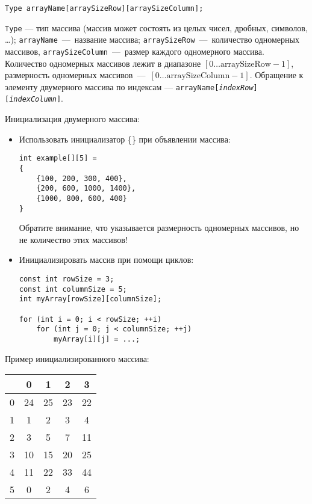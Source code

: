 \lstinline|Type arrayName[arraySizeRow][arraySizeColumn];|

\lstinline|Type| --- тип массива (массив может состоять из целых чисел, дробных, символов, \ldots); \lstinline|arrayName|~---~название массива; \lstinline|arraySizeRow|~---~количество одномерных массивов, \lstinline|arraySizeColumn|~---~размер каждого одномерного массива. Количество одномерных массивов лежит в диапазоне $\left[ 0 \ldots \text{arraySizeRow} - 1 \right]$, размерность одномерных массивов~---~$\left[ 0 \ldots \text{arraySizeColumn} - 1 \right]$. Обращение к элементу двумерного массива по индексам --- \texttt{arrayName[\textit{indexRow}][\textit{indexColumn}]}.

Инициализация двумерного массива:
\begin{itemize}
    \item Использовать инициализатор \{\} при объявлении массива:
    \begin{lstlisting}
int example[][5] =
{
    {100, 200, 300, 400},
    {200, 600, 1000, 1400},
    {1000, 800, 600, 400}
}
    \end{lstlisting}

    Обратите внимание, что указывается размерность одномерных массивов, но не количество этих массивов!

    \item Инициализировать массив при помощи циклов:
    \begin{lstlisting}
const int rowSize = 3;
const int columnSize = 5;
int myArray[rowSize][columnSize];

for (int i = 0; i < rowSize; ++i)
    for (int j = 0; j < columnSize; ++j)
        myArray[i][j] = ...;
    \end{lstlisting}
\end{itemize}

Пример инициализированного массива:
\begin{table}[h]
    \begin{tabular}{|c|c|c|c|c|}
        \hline
          & 0 & 1 & 2 & 3 \\
        \hline
        0 & 24 & 25 & 23 & 22 \\
        \hline
        1 & 1 & 2 & 3 & 4 \\
        \hline
        2 & 3 & 5 & 7 & 11 \\
        \hline
        3 & 10 & 15 & 20 & 25 \\
        \hline
        4 & 11 & 22 & 33 & 44 \\
        \hline
        5 & 0 & 2 & 4 & 6 \\
        \hline
    \end{tabular}
\end{table}

